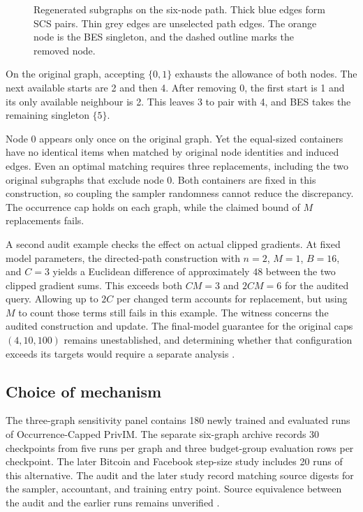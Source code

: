 \begin{figure}[!htbp]
\centering

\caption[Occurrence-capped sampling before and after node removal]{Regenerated subgraphs on the six-node path. Thick blue edges form SCS pairs. Thin grey edges are unselected path edges. The orange node is the BES singleton, and the dashed outline marks the removed node.}
\label{fig:floor1-removal}
\end{figure}

On the original graph, accepting $\{0,1\}$ exhausts the allowance of both nodes. The next available starts are 2 and then 4. After removing 0, the first start is 1 and its only available neighbour is 2. This leaves 3 to pair with 4, and BES takes the remaining singleton $\{5\}$.

Node 0 appears only once on the original graph. Yet the equal-sized containers have no identical items when matched by original node identities and induced edges. Even an optimal matching requires three replacements, including the two original subgraphs that exclude node 0. Both containers are fixed in this construction, so coupling the sampler randomness cannot reduce the discrepancy. The occurrence cap holds on each graph, while the claimed bound of $M$ replacements fails.

A second audit example checks the effect on actual clipped gradients. At fixed model parameters, the directed-path construction with $n=2$, $M=1$, $B=16$, and $C=3$ yields a Euclidean difference of approximately $48$ between the two clipped gradient sums. This exceeds both $CM=3$ and $2CM=6$ for the audited query. Allowing up to $2C$ per changed term accounts for replacement, but using $M$ to count those terms still fails in this example. The witness concerns the audited construction and update. The final-model guarantee for the original caps $(4,10,100)$ remains unestablished, and determining whether that configuration exceeds its targets would require a separate analysis \cite{floor1audit}.

\subsection{Choice of mechanism}
The three-graph sensitivity panel contains 180 newly trained and evaluated runs of Occurrence-Capped PrivIM. The separate six-graph archive records 30 checkpoints from five runs per graph and three budget-group evaluation rows per checkpoint. The later Bitcoin and Facebook step-size study includes 20 runs of this alternative. The audit and the later study record matching source digests for the sampler, accountant, and training entry point. Source equivalence between the audit and the earlier runs remains unverified \cite{floor1audit,floor1runs}.

